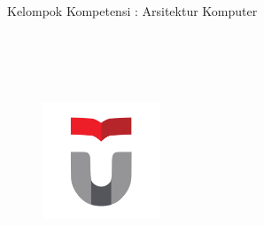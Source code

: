 \begin{titlepage}
	\begin{center}
		\vspace*{1.0cm}
		\bo{\Judul} \\[1.0cm]
		\bo{\Type} \\
		Kelompok Kompetensi : Arsitektur Komputer \\[1.0cm]
		\\[1.0cm]
		\\[1.0cm]
		\bo{\Penulis} \\
		\bo{\npm} \\
		
		\begin{figure}
			\begin{center}
				\includegraphics[width=3.5cm]{pics/telu.png}
			\end{center}
		\end{figure}    
		
	\end{center}
\end{titlepage}